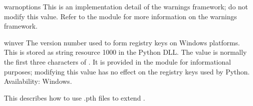 \begin{datadesc}{warnoptions}
  This is an implementation detail of the warnings framework; do not
  modify this value.  Refer to the  module for
  more information on the warnings framework.
\end{datadesc}

\begin{datadesc}{winver}
  The version number used to form registry keys on Windows platforms.
  This is stored as string resource 1000 in the Python DLL.  The value
  is normally the first three characters of .  It is
  provided in the  module for informational purposes;
  modifying this value has no effect on the registry keys used by
  Python.
  Availability: Windows.
\end{datadesc}


\begin{seealso}
    {This describes how to use .pth files to extend .}
\end{seealso}

